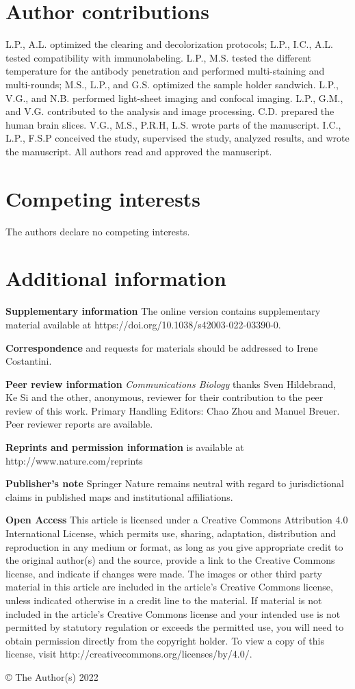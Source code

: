 \documentclass{article}
\begin{document}
\section*{Author contributions}

L.P., A.L. optimized the clearing and decolorization protocols; L.P., I.C., A.L. tested compatibility with immunolabeling. L.P., M.S. tested the different temperature for the antibody penetration and performed multi-staining and multi-rounds; M.S., L.P., and G.S. optimized the sample holder sandwich. L.P., V.G., and N.B. performed light-sheet imaging and confocal imaging. L.P., G.M., and V.G. contributed to the analysis and image processing. C.D. prepared the human brain slices. V.G., M.S., P.R.H, L.S. wrote parts of the manuscript. I.C., L.P., F.S.P conceived the study, supervised the study, analyzed results, and wrote the manuscript. All authors read and approved the manuscript.

\section*{Competing interests}

The authors declare no competing interests.

\section*{Additional information}

\textbf{Supplementary information} The online version contains supplementary material available at https://doi.org/10.1038/s42003-022-03390-0.

\textbf{Correspondence} and requests for materials should be addressed to Irene Costantini.

\textbf{Peer review information} \emph{Communications Biology} thanks Sven Hildebrand, Ke Si and the other, anonymous, reviewer for their contribution to the peer review of this work. Primary Handling Editors: Chao Zhou and Manuel Breuer. Peer reviewer reports are available.

\textbf{Reprints and permission information} is available at http://www.nature.com/reprints

\textbf{Publisher’s note} Springer Nature remains neutral with regard to jurisdictional claims in published maps and institutional affiliations.

\textbf{Open Access} This article is licensed under a Creative Commons Attribution 4.0 International License, which permits use, sharing, adaptation, distribution and reproduction in any medium or format, as long as you give appropriate credit to the original author(s) and the source, provide a link to the Creative Commons license, and indicate if changes were made. The images or other third party material in this article are included in the article’s Creative Commons license, unless indicated otherwise in a credit line to the material. If material is not included in the article’s Creative Commons license and your intended use is not permitted by statutory regulation or exceeds the permitted use, you will need to obtain permission directly from the copyright holder. To view a copy of this license, visit http://creativecommons.org/licenses/by/4.0/.

© The Author(s) 2022
\end{document}
